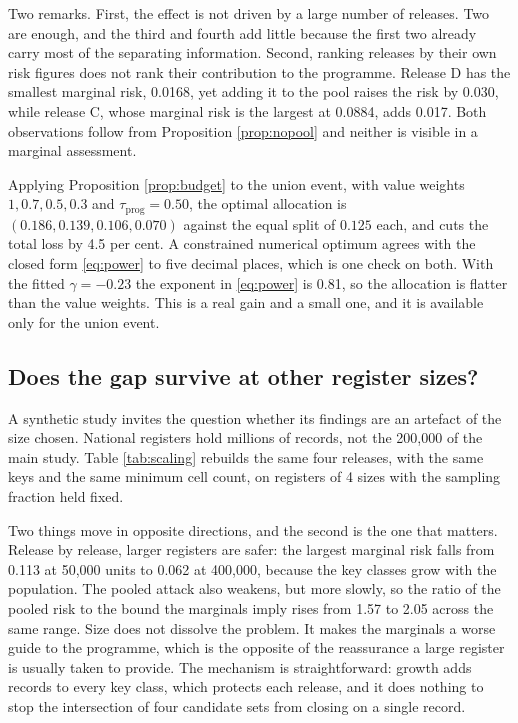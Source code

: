 \documentclass[11pt,a4paper]{article}
\theoremstyle{plain}
\theoremstyle{definition}
\begin{document}
Two remarks. First, the effect is not driven by a large number of releases. Two
are enough, and the third and fourth add little because the first two already
carry most of the separating information. Second, ranking releases by their own
risk figures does not rank their contribution to the programme. Release D has the smallest marginal risk, 0.0168, yet adding it to the pool
raises the risk by 0.030, while release C, whose marginal risk is the largest at
0.0884, adds 0.017.
Both observations follow from Proposition \ref{prop:nopool} and neither is
visible in a marginal assessment.

Applying Proposition \ref{prop:budget} to the union event, with value weights
$1, 0.7, 0.5, 0.3$ and $\tau_{\mathrm{prog}} = 0.50$, the optimal allocation is
$(0.186, 0.139, 0.106, 0.070)$ against the equal split of $0.125$ each, and cuts
the total loss by 4.5 per cent. A constrained numerical optimum agrees with the
closed form \eqref{eq:power} to five decimal places, which is one check on both.
With the fitted $\gamma = -0.23$ the exponent in \eqref{eq:power} is 0.81, so the
allocation is flatter than the value weights. This is a real gain and a small
one, and it is available only for the union event.

\subsection{Does the gap survive at other register sizes?}\label{sec:scaling}

A synthetic study invites the question whether its findings are an artefact of
the size chosen. National registers hold millions of records, not the
200{,}000 of the main study. Table \ref{tab:scaling} rebuilds the same four
releases, with the same keys and the same minimum cell count, on registers of
4 sizes with the sampling fraction held fixed.



Two things move in opposite directions, and the second is the one that matters.
Release by release, larger registers are safer: the largest marginal risk falls
from 0.113 at 50{,}000 units to
0.062 at 400{,}000, because the key classes grow
with the population. The pooled attack also weakens, but more slowly, so the
ratio of the pooled risk to the bound the marginals imply rises from
1.57 to 2.05 across the same range. Size does not
dissolve the problem. It makes the marginals a worse guide to the programme,
which is the opposite of the reassurance a large register is usually taken to
provide. The mechanism is straightforward: growth adds records to every key
class, which protects each release, and it does nothing to stop the intersection
of four candidate sets from closing on a single record.
\end{document}
